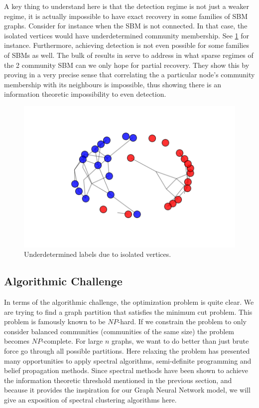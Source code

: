 A key thing to understand here is that the detection regime is not just a weaker regime, it is actually impossible to have exact recovery in some families of SBM graphs.  Consider for instance when the SBM is not connected. In that case, the isolated vertices would have underdetermined community membership.  See \ref{fig:sparse} for instance. Furthermore, achieving detection is not even possible for some families of SBMs as well.  The bulk of results in \cite{MNS} serve to address in what sparse regimes of the 2 community SBM can we only hope for partial recovery. They show this by proving in a very precise sense that correlating the a particular node's community membership with its neighbours is impossible, thus showing there is an information theoretic impossibility to even detection.  


\begin{figure}[h]
\begin{center}
  \includegraphics[scale=0.5]{SBM_balanced_large_sparse.png}
  \caption{Underdetermined labels due to isolated vertices.}
  \label{fig:sparse}
 \end{center}
\end{figure}

\subsection{Algorithmic Challenge}

In terms of the algorithmic challenge, the optimization problem is quite clear.  We are trying to find a graph partition that satisfies the minimum cut problem.  This problem is famously known to be $NP$-hard. If we constrain the problem to only consider balanced communities (communities of the same size) the problem becomes $NP$-complete.  For large $n$ graphs, we want to do better than just brute force go through all possible partitions.  Here relaxing the problem has presented many opportunities to apply spectral algorithms, semi-definite programming and belief propagation methods.  Since spectral methods have been shown to achieve the information theoretic threshold mentioned in the previous section, and because it provides the inspiration for our Graph Neural Network model, we will give an exposition of spectral clustering algorithms here.  

